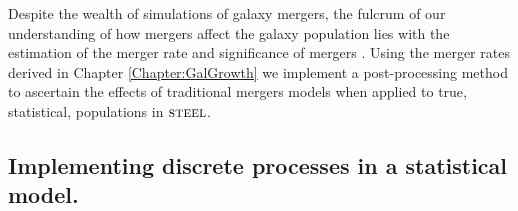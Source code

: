 Despite the wealth of simulations of galaxy mergers, the fulcrum of our understanding of how mergers affect the galaxy population lies with the estimation of the merger rate and significance of mergers \cite{Hopkins2010MERGERSMATTER, Hopkins2010MergersRate}. Using the merger rates derived in Chapter \ref{Chapter:GalGrowth} we implement a post-processing method to ascertain the effects of traditional mergers models when applied to true, statistical, populations in $\textsc{steel}$.

\subsection{Implementing discrete processes in a statistical model.}

